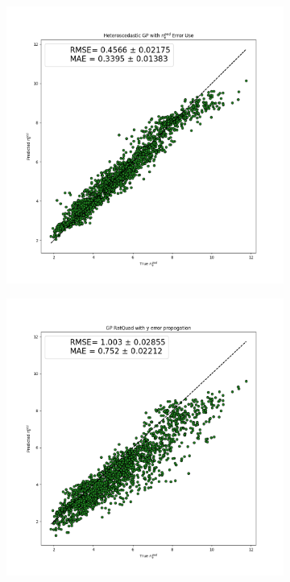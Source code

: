 \documentclass[a4paper, twoside, final, 12pt]{article}
\begin{document}
{\begin{figure}
	\begin{subfigure}{0.3\linewidth}
		\centering
		\includegraphics[scale=0.2]{./src/GP_MLP_hetero_neped_preds}
		\caption{}
		\label{subfig:hetero_gp_input}
	\end{subfigure}
	\begin{subfigure}{0.33\linewidth}
		\centering
		\includegraphics[scale=0.2]{./src/GP_RatQuad_w_neped_uncert_prop}

\end{subfigure}
\end{figure}}
\end{document}
